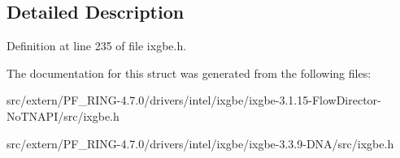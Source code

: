\subsection{Detailed Description}


Definition at line 235 of file ixgbe.h.



The documentation for this struct was generated from the following files:\begin{DoxyCompactItemize}
\item 
src/extern/PF\_\-RING-\/4.7.0/drivers/intel/ixgbe/ixgbe-\/3.1.15-\/FlowDirector-\/NoTNAPI/src/ixgbe.h\item 
src/extern/PF\_\-RING-\/4.7.0/drivers/intel/ixgbe/ixgbe-\/3.3.9-\/DNA/src/ixgbe.h\end{DoxyCompactItemize}
